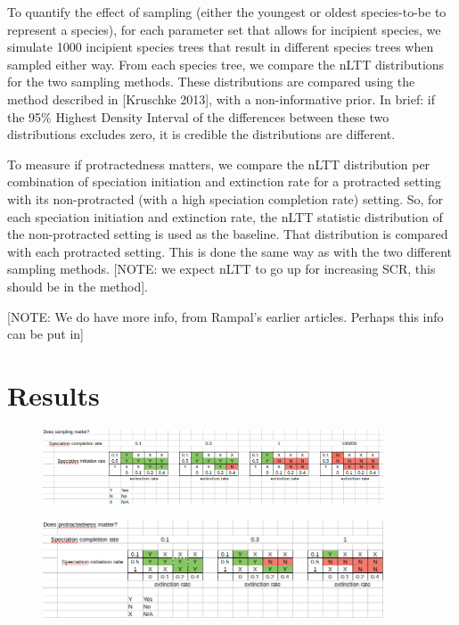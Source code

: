 \documentclass{article}
\begin{document}
To quantify the effect of sampling (either the youngest or oldest species-to-be to represent
a species), for each parameter set that allows for incipient species,
we simulate 1000 incipient species trees that result in different species trees
when sampled either way. From each species tree, we compare the nLTT distributions
for the two sampling methods. These distributions are compared 
using the method described in [Kruschke 2013], with a non-informative
prior. In brief: if the 95\% Highest Density Interval of the differences between 
these two distributions excludes zero, it is credible the distributions are different. 

To measure if protractedness matters, we compare the nLTT distribution per
combination of speciation initiation and extinction rate for a protracted
setting with its non-protracted (with a high speciation completion 
rate) setting. So, for each speciation initiation and extinction rate, 
the nLTT statistic distribution of the 
non-protracted setting is used as the baseline. That distribution is compared
with each protracted setting. This is done the same way as with the two
different sampling methods. [NOTE: we expect nLTT to go up for increasing SCR,
this should be in the method].

[NOTE: We do have more info, from Rampal's earlier articles. Perhaps this 
info can be put in]

\section{Results}

\begin{figure}[]
  \includegraphics[width=0.9\textwidth]{fig_does_sampling_matter.png}
\end{figure}

\begin{figure}[]
  \includegraphics[width=0.9\textwidth]{fig_does_protractedness_matter.png}
\end{figure}
\end{document}

